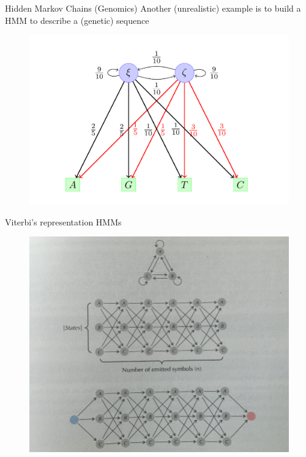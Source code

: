 \documentclass{beamer}
\begin{document}
\begin{frame}{Hidden Markov Chains (Genomics)}
	Another (unrealistic) example is to build a HMM to describe a (genetic) sequence
	
	\begin{figure}[h]
	\centering
		\includegraphics[scale=0.5]{../Figures/hmm_example.png}
\end{figure}
\end{frame}
\begin{frame}{Viterbi's representation HMMs}
		\begin{figure}[h]
		\centering
			\includegraphics[scale=0.6]{../Figures/fig_hmm.png}
	\end{figure}
\end{frame}
\end{document}
